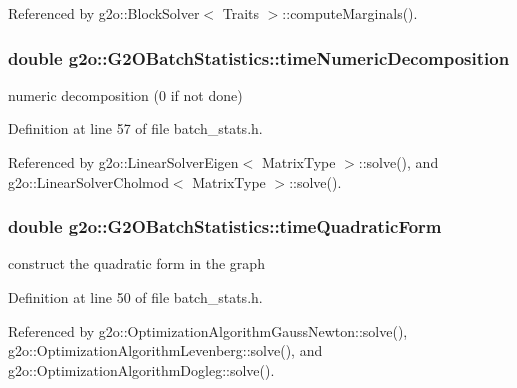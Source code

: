 Referenced by g2o\+::\+Block\+Solver$<$ Traits $>$\+::compute\+Marginals().

\subsubsection[{\texorpdfstring{time\+Numeric\+Decomposition}{timeNumericDecomposition}}]{\setlength{\rightskip}{0pt plus 5cm}double g2o\+::\+G2\+O\+Batch\+Statistics\+::time\+Numeric\+Decomposition}\hypertarget{structg2o_1_1G2OBatchStatistics_a31f4a361dba1f3eb8dba2ca2aa326905}{}\label{structg2o_1_1G2OBatchStatistics_a31f4a361dba1f3eb8dba2ca2aa326905}


numeric decomposition (0 if not done) 



Definition at line 57 of file batch\+\_\+stats.\+h.



Referenced by g2o\+::\+Linear\+Solver\+Eigen$<$ Matrix\+Type $>$\+::solve(), and g2o\+::\+Linear\+Solver\+Cholmod$<$ Matrix\+Type $>$\+::solve().

\subsubsection[{\texorpdfstring{time\+Quadratic\+Form}{timeQuadraticForm}}]{\setlength{\rightskip}{0pt plus 5cm}double g2o\+::\+G2\+O\+Batch\+Statistics\+::time\+Quadratic\+Form}\hypertarget{structg2o_1_1G2OBatchStatistics_af949afd7e25ceef08379220ed242aa36}{}\label{structg2o_1_1G2OBatchStatistics_af949afd7e25ceef08379220ed242aa36}


construct the quadratic form in the graph 



Definition at line 50 of file batch\+\_\+stats.\+h.



Referenced by g2o\+::\+Optimization\+Algorithm\+Gauss\+Newton\+::solve(), g2o\+::\+Optimization\+Algorithm\+Levenberg\+::solve(), and g2o\+::\+Optimization\+Algorithm\+Dogleg\+::solve().

